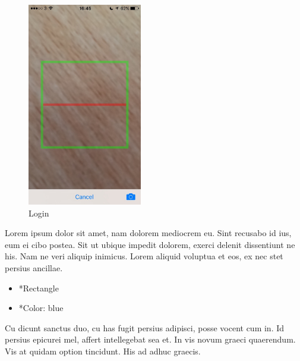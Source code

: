\begin{minipage}{5cm}
	\begin{figure}[H]
		\includegraphics[width=5cm]{img/mobile-app/screen-shots/IMG_2915.jpg}
		\caption{Login}
	\end{figure}
\end{minipage} \hfill
\begin{minipage}{0.55\textwidth}
	Lorem ipsum dolor sit amet, nam dolorem mediocrem eu. Sint recusabo id ius, eum ei cibo postea. Sit ut ubique impedit dolorem, exerci delenit dissentiunt ne his. Nam ne veri aliquip inimicus. Lorem aliquid voluptua et eos, ex nec stet persius ancillae.
	\begin{itemize}
		\item *Rectangle
		\item *Color: blue
	\end{itemize}
	Cu dicunt sanctus duo, cu has fugit persius adipisci, posse vocent cum in. Id persius epicurei mel, affert intellegebat sea et. In vis novum graeci quaerendum. Vis at quidam option tincidunt. His ad adhuc graecis.
\end{minipage}

